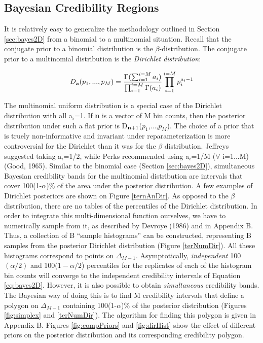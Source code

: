 \documentclass{article}
\begin{document}

\subsection{Bayesian Credibility Regions}
\label{sec:bayes3D}

It  is  relatively easy  to  generalize  the  methodology outlined  in
Section \ref{sec:bayes2D} from a  binomial to a multinomial situation.
Recall  that the  conjugate prior  to a  binomial distribution  is the
$\beta$-distribution.    The   conjugate   prior  to   a   multinomial
distribution is the {\it Dirichlet distribution}:

\begin{equation}
  \label{eq:dirichlet}
  D_{\bf a}(p_1,...,p_M)=
  \frac{\Gamma(\sum_{i=1}^{i=M}{a_i})}{\prod_{i=1}^{i=M}\Gamma(a_i)}
  \prod_{i=1}^{i=M}p_i^{a_i-1}
\end{equation}

The  multinomial  uniform  distribution  is  a  special  case  of  the
Dirichlet distribution with all a$_i$=1.  If  {\bf n} is a vector of M
bin counts, then the posterior distribution under such a flat prior is
D$_{{\bf  n}+1}$($p_1$,...,$p_M$).   The choice  of  a  prior that  is
truely non-informative and  invariant under reparameterization is more
controversial  for   the  Dirichlet  than  it  was   for  the  $\beta$
distribution.   Jeffreys  suggested   taking  a$_i$=1/2,  while  Perks
recommended using a$_i$=1/M ($\forall$ i=1...M) (Good, 1965).  Similar
to  the   binomial  case  (Section   \ref{sec:bayes2D}),  simultaneous
Bayesian  credibility  bands  for  the  multinomial  distribution  are
intervals that cover 100(1-$\alpha$)\% of the area under the posterior
distribution.   A few examples  of Dirichlet  posteriors are  shown on
Figure \ref{ternAnDir}.  As opposed to the $\beta$ distribution, there
are no  tables of the  percentiles of the Dirichlet  distribution.  In
order to integrate this  multi-dimensional function ourselves, we have
to numerically sample  from it, as described by  Devroye (1986) and in
Appendix B.\\

Thus,  a collection  of B  ``sample histograms''  can  be constructed,
representing  B  samples  from  the posterior  Dirichlet  distribution
(Figure \ref{terNumDir}).   All these histograms  correspond to points
on $\Delta_{M-1}$.   Asymptotically, {\it independent} 100$(\alpha/2)$
and 100($1-\alpha/2$)  percentiles for the  replicates of each  of the
histogram  bin counts  will  converge to  the independent  credibility
intervals of Equation \ref{eq:bayes2D}.   However, it is also possible
to obtain  {\it simultaneous} credibility bands.  The  Bayesian way of
doing this is to find M credibility intervals that define a polygon on
$\Delta_{M-1}$   containing   100(1-$\alpha$)\%   of   the   posterior
distribution  (Figures  \ref{fig:simplex}  and \ref{terNumDir}).   The
algorithm for  finding this polygon  is given in Appendix  B.  Figures
\ref{fig:compPriors}   and  \ref{fig:dirHist}   show  the   effect  of
different priors  on the posterior distribution  and its corresponding
credibility polygon.\\
\end{document}
